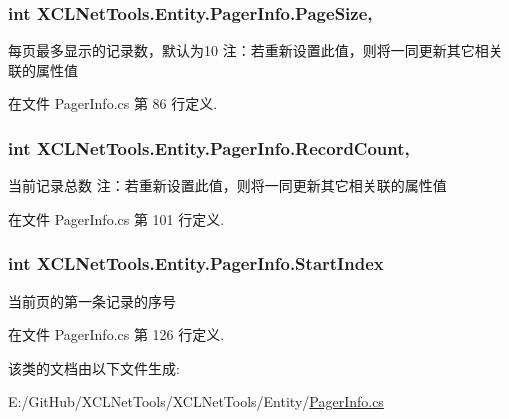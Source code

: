 \subsubsection[{\texorpdfstring{Page\+Size}{PageSize}}]{\setlength{\rightskip}{0pt plus 5cm}int X\+C\+L\+Net\+Tools.\+Entity.\+Pager\+Info.\+Page\+Size\hspace{0.3cm}{\ttfamily [get]}, {\ttfamily [set]}}\hypertarget{class_x_c_l_net_tools_1_1_entity_1_1_pager_info_af9b5f737263571d79ead065f6faaa5ca}{}\label{class_x_c_l_net_tools_1_1_entity_1_1_pager_info_af9b5f737263571d79ead065f6faaa5ca}


每页最多显示的记录数，默认为10 注：若重新设置此值，则将一同更新其它相关联的属性值 



在文件 Pager\+Info.\+cs 第 86 行定义.

\subsubsection[{\texorpdfstring{Record\+Count}{RecordCount}}]{\setlength{\rightskip}{0pt plus 5cm}int X\+C\+L\+Net\+Tools.\+Entity.\+Pager\+Info.\+Record\+Count\hspace{0.3cm}{\ttfamily [get]}, {\ttfamily [set]}}\hypertarget{class_x_c_l_net_tools_1_1_entity_1_1_pager_info_a5617d4aaafa80fa664f13cfe7fbc1a6c}{}\label{class_x_c_l_net_tools_1_1_entity_1_1_pager_info_a5617d4aaafa80fa664f13cfe7fbc1a6c}


当前记录总数 注：若重新设置此值，则将一同更新其它相关联的属性值 



在文件 Pager\+Info.\+cs 第 101 行定义.

\subsubsection[{\texorpdfstring{Start\+Index}{StartIndex}}]{\setlength{\rightskip}{0pt plus 5cm}int X\+C\+L\+Net\+Tools.\+Entity.\+Pager\+Info.\+Start\+Index\hspace{0.3cm}{\ttfamily [get]}}\hypertarget{class_x_c_l_net_tools_1_1_entity_1_1_pager_info_a659b36bf635a3fed41ee3b82ec4c2cbe}{}\label{class_x_c_l_net_tools_1_1_entity_1_1_pager_info_a659b36bf635a3fed41ee3b82ec4c2cbe}


当前页的第一条记录的序号 



在文件 Pager\+Info.\+cs 第 126 行定义.



该类的文档由以下文件生成\+:\begin{DoxyCompactItemize}
\item 
E\+:/\+Git\+Hub/\+X\+C\+L\+Net\+Tools/\+X\+C\+L\+Net\+Tools/\+Entity/\hyperlink{_pager_info_8cs}{Pager\+Info.\+cs}\end{DoxyCompactItemize}
